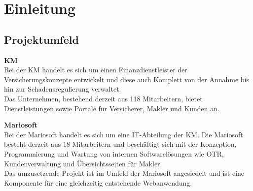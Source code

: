 \newpage

\section{Einleitung}
\label{einleitung}

\subsection{Projektumfeld}
\label{projektumfeld}
\textbf{\acl{KM}}
\\

Bei der \ac{KM} handelt es sich um einen Finanzdienstleister der Versicherungskonzepte entwickelt und diese auch Komplett von der Annahme bis hin zur Schadensregulierung verwaltet.\\
Das Unternehmen, bestehend derzeit aus 118 Mitarbeitern, bietet Dienstleistungen sowie Portale für Versicherer, Makler und Kunden an.

\textbf{Mariosoft}
\\

Bei der Mariosoft handelt es sich um eine IT-Abteilung der \ac{KM}. Die Mariosoft besteht derzeit aus 18 Mitarbeitern und beschäftigt sich mit der Konzeption, Programmierung und Wartung von internen Softwarelösungen wie \ac{OTR}, Kundenverwaltung und Übersichtsseiten für Makler.
\\
Das umzusetzende Projekt ist im Umfeld der Mariosoft angesiedelt und ist eine Komponente für eine gleichzeitig entstehende Webanwendung.

